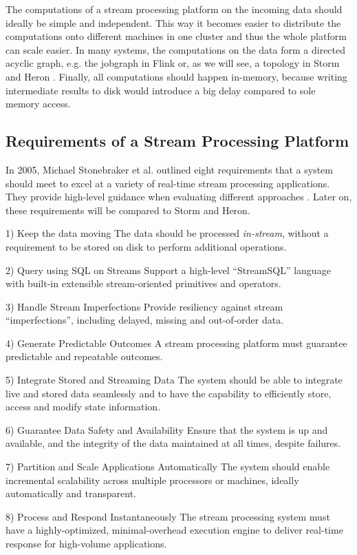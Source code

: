 \documentclass[conference]{IEEEtran}
\begin{document}
The computations of a stream processing platform on the incoming data should ideally be simple and independent.
This way it becomes easier to distribute the computations onto different machines in one cluster and thus the whole platform can scale easier.
In many systems, the computations on the data form a directed acyclic graph, e.g. the jobgraph in Flink or, as we will see, a topology in Storm and Heron \cite{Flink}.
Finally, all computations should happen in-memory, because writing intermediate results to disk would introduce a big delay compared to sole memory access.


\subsection{Requirements of a Stream Processing Platform}
\label{sec:RequirementsOfAStreamProcessingPlatform}

In 2005, Michael Stonebraker et al. outlined eight requirements that a system should meet to excel at a variety of real-time stream processing applications.
They provide high-level guidance when evaluating different approaches \cite{The8Requirements}.
Later on, these requirements will be compared to Storm and Heron.

\begin{LaTeXdescription}
  \item[1) Keep the data moving] The data should be processed \emph{in-stream}, without a requirement to be stored on disk to perform additional operations.
  \item[2) Query using SQL on Streams] Support a high-level “StreamSQL” language with built-in extensible stream-oriented primitives and operators.
  \item[3) Handle Stream Imperfections] Provide resiliency against stream “imperfections”, including delayed, missing and out-of-order data.
  \item[4) Generate Predictable Outcomes] A stream processing platform must guarantee predictable and repeatable outcomes.
  \item[5) Integrate Stored and Streaming Data] The system should be able to integrate live and stored data seamlessly and to have the capability to efficiently store, access and modify state information.
  \item[6) Guarantee Data Safety and Availability] Ensure that the system is up and available, and the integrity of the data maintained at all times, despite failures.
  \item[7) Partition and Scale Applications Automatically] The system should enable incremental scalability across multiple processors or machines, ideally automatically and transparent.
  \item[8) Process and Respond Instantaneously] The stream processing system must have a highly-optimized, minimal-overhead execution engine to deliver real-time response for high-volume applications.
\end{LaTeXdescription}
\end{document}
